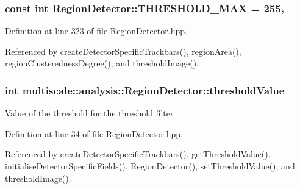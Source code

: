 \hypertarget{classmultiscale_1_1analysis_1_1RegionDetector_a53c6e2b067a8b8c82484cbca34cc3d57}{
\subsubsection[{T\-H\-R\-E\-S\-H\-O\-L\-D\-\_\-\-M\-A\-X}]{\setlength{\rightskip}{0pt plus 5cm}const int Region\-Detector\-::\-T\-H\-R\-E\-S\-H\-O\-L\-D\-\_\-\-M\-A\-X = 255\hspace{0.3cm}{\ttfamily [static]}, {\ttfamily [private]}}}\label{classmultiscale_1_1analysis_1_1RegionDetector_a53c6e2b067a8b8c82484cbca34cc3d57}


Definition at line 323 of file Region\-Detector.\-hpp.



Referenced by create\-Detector\-Specific\-Trackbars(), region\-Area(), region\-Clusteredness\-Degree(), and threshold\-Image().

\hypertarget{classmultiscale_1_1analysis_1_1RegionDetector_a0f7469d124c0b906d199e00ea5713007}{
\subsubsection[{threshold\-Value}]{\setlength{\rightskip}{0pt plus 5cm}int multiscale\-::analysis\-::\-Region\-Detector\-::threshold\-Value\hspace{0.3cm}{\ttfamily [private]}}}\label{classmultiscale_1_1analysis_1_1RegionDetector_a0f7469d124c0b906d199e00ea5713007}
Value of the threshold for the threshold filter 

Definition at line 34 of file Region\-Detector.\-hpp.



Referenced by create\-Detector\-Specific\-Trackbars(), get\-Threshold\-Value(), initialise\-Detector\-Specific\-Fields(), Region\-Detector(), set\-Threshold\-Value(), and threshold\-Image().

